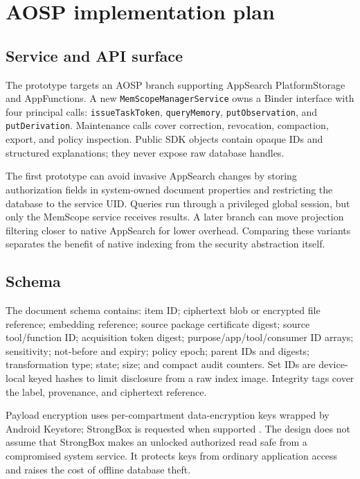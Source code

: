 \section{AOSP implementation plan}
\label{sec:implementation}

\subsection{Service and API surface}

The prototype targets an AOSP branch supporting AppSearch PlatformStorage and AppFunctions. A new \texttt{MemScopeManagerService} owns a Binder interface with four principal calls: \texttt{issueTaskToken}, \texttt{queryMemory}, \texttt{putObservation}, and \texttt{putDerivation}. Maintenance calls cover correction, revocation, compaction, export, and policy inspection. Public SDK objects contain opaque IDs and structured explanations; they never expose raw database handles.

The first prototype can avoid invasive AppSearch changes by storing authorization fields in system-owned document properties and restricting the database to the service UID. Queries run through a privileged global session, but only the MemScope service receives results. A later branch can move projection filtering closer to native AppSearch for lower overhead. Comparing these variants separates the benefit of native indexing from the security abstraction itself.

\subsection{Schema}

The document schema contains: item ID; ciphertext blob or encrypted file reference; embedding reference; source package certificate digest; source tool/function ID; acquisition token digest; purpose/app/tool/consumer ID arrays; sensitivity; not-before and expiry; policy epoch; parent IDs and digests; transformation type; state; size; and compact audit counters. Set IDs are device-local keyed hashes to limit disclosure from a raw index image. Integrity tags cover the label, provenance, and ciphertext reference.

Payload encryption uses per-compartment data-encryption keys wrapped by Android Keystore; StrongBox is requested when supported \citep{android2026strongbox}. The design does not assume that StrongBox makes an unlocked authorized read safe from a compromised system service. It protects keys from ordinary application access and raises the cost of offline database theft.

